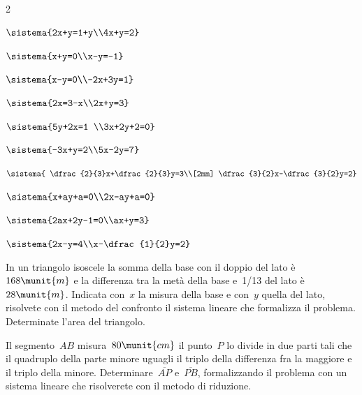 \begin{esercizio}[*]
\begin{htmulticols}{2}
\begin{enumeratea}
 \item \(\sistema{2x+y=1+y\\4x+y=2}\)
 \item \(\sistema{x+y=0\\x-y=-1}\)
 \item \(\sistema{x-y=0\\-2x+3y=1}\)
 \item \(\sistema{2x=3-x\\2x+y=3}\)
 \item \(\sistema{5y+2x=1 \\3x+2y+2=0}\)
 \item \(\sistema{-3x+y=2\\5x-2y=7}\)
 \item \(\sistema{
 \dfrac{2}{3}x+\dfrac{2}{3}y=3\\[2mm]
 \dfrac{3}{2}x-\dfrac{3}{2}y=2}\)
 \item \(\sistema{x+ay+a=0\\2x-ay+a=0}\)
 \item \(\sistema{2ax+2y-1=0\\ax+y=3}\)
 \item \(\sistema{2x-y=4\\x-\dfrac{1}{2}y=2}\)
\end{enumeratea}
 \end{htmulticols}
\end{esercizio}

\begin{esercizio}
 \label{ese:22.19}
In un triangolo isoscele la somma della base con il doppio del lato
è~\(168\munit{m}\) e la differenza tra la metà della base e~1/13 del lato 
è~\(28\munit{m}\).
Indicata con~\(x\) la misura della base e con~\(y\) quella del lato,
risolvete con il metodo del confronto il sistema lineare che formalizza
il problema. Determinate l'area del triangolo.
 \end{esercizio}

\begin{esercizio}
 \label{ese:22.23}
Il segmento~\(AB\) misura~\(80\munit{cm}\) il punto~\(P\) lo divide in due 
parti tali 
che il quadruplo della parte minore uguagli il triplo della differenza fra 
la maggiore e il triplo della minore. 
Determinare~\(\overline{AP}\) e~\(\overline{PB}\), formalizzando
il problema con un sistema lineare che risolverete con il metodo di
riduzione.
\begin{center}
%  
\end{center}
\end{esercizio}

